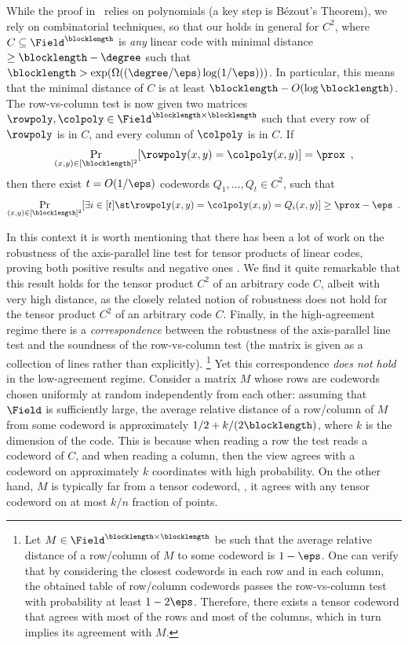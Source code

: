 \documentclass{toc}
\theoremstyle{plain}
\begin{document}
%
%
%
%
%
%
%
%
\label{par:beyondpoly}
While
%
the proof in~\cite{PolishchukS94}   %
relies on polynomials (a key step is B\'{e}zout's Theorem), we rely on combinatorial techniques, so that our  holds in general
%
%
for $C^2$, where $C \subseteq \Field^{\blocklength}$ is \emph{any} linear code      %
with minimal distance $\geq \blocklength-\degree$ such that $\blocklength > \exp(\Omega(({\degree}/{\eps}) \log({1}/{\eps})))$.
In particular, this means that the minimal distance of $C$ is at least $\blocklength - O(\log \blocklength)$.
The row-vs-column test is now given two matrices $\rowpoly,\colpoly \in \Field^{\blocklength \times \blocklength}$ such that every row of $\rowpoly$ is in $C$, and every column of $\colpoly$ is in $C$. If
\[
  \Pr_{(x,y) \in [\blocklength]^2}[\rowpoly(x,y) = \colpoly(x,y)] = \prox\enspace,
\]
then there exist $t = O(1/\eps)$ codewords $Q_1,\dots,Q_t \in
C^2$, %
such that
\[
  \Pr_{(x,y) \in [\blocklength]^2}[\exists i \in [t] \st \rowpoly(x,y)
  = \colpoly(x,y) = Q_i(x,y)] \geq \prox - \eps\enspace.
\]


In this context it is worth mentioning that there has been a lot of work on the robustness of the axis-parallel line test for
%
tensor products of linear codes,                                                %
proving both positive results \cite{Ben-SassonS06,DinurSW06} and negative ones \cite{Valiant05,CoppersmithR05,GoldreichM12}.
We find it quite remarkable that this result holds for
%
the tensor product $C^2$ of an arbitrary code $C$,                                          %
albeit with very high distance,
as the closely related notion of robustness does not hold for
%
the tensor product $C^2$ of an arbitrary code $C$.                                          %
Finally, in the high-agreement regime there is a \emph{correspondence} between
the robustness of the axis-parallel line test
and the soundness of the row-vs-column test (the matrix is given as a collection of lines rather than explicitly).%
\footnote{
Let $M \in \Field^{\blocklength \times \blocklength}$ be such that
the average relative distance of a row/column of $M$ to some codeword is $1-\eps$.
One can verify that by considering the closest codewords in each row and in each column,
the obtained table of row/column codewords
passes the row-vs-column test with probability at least $1-2\eps$.
Therefore, there exists a tensor codeword that agrees with most of the rows and most of the columns,
which in turn implies its agreement with $M$.}
Yet this correspondence \emph{does not hold} in the low-agreement regime. Consider a matrix $M$ whose rows are codewords chosen uniformly at random independently from each other: assuming that $\Field$ is sufficiently large, the average relative distance of a row/column of $M$ from some codeword is approximately ${1}/{2} + {k}/{(2\blocklength)}$, where $k$ is the dimension of the code. This is because when reading a row the test reads a codeword of $C$, and when reading a column, then the view agrees with a codeword on approximately $k$ coordinates with high probability.
On the other hand, $M$ is typically far from a tensor codeword, \eg, it agrees with any tensor codeword on at most $k/n$ fraction of points.
\end{document}
